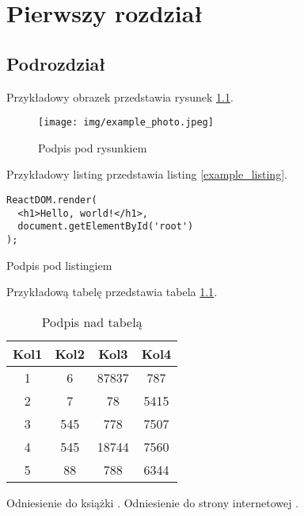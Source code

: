 \documentclass[a4paper,12pt,polish,twoside]{extreport}
\begin{document}


\null\newpage

\tableofcontents

\chapter{Pierwszy rozdział}

\section{Podrozdział}

Przykładowy obrazek przedstawia rysunek \ref{example_image}.

\begin{figure}[H]
    \centering
    \texttt{[image: img/example\_photo.jpeg]}
    \caption[Podpis w spisie rysunków]{Podpis pod rysunkiem}
    \label{example_image}
\end{figure}

Przykładowy listing przedstawia listing \ref{example_listing}.

\begin{code}[H]
\begin{lstlisting}
ReactDOM.render(
  <h1>Hello, world!</h1>,
  document.getElementById('root')
);
\end{lstlisting}
\caption[Podpis w spisie listingów]{Podpis pod listingiem}
\label{example_listing}
\end{code}

Przykładową tabelę przedstawia tabela \ref{example_table}.
 
\begin{table}[H]
\centering
\begin{tabular}{|c | c | c | c|} 
 \hline
 Kol1 & Kol2 & Kol3 & Kol4 \\
 \hline
 1 & 6 & 87837 & 787 \\
 2 & 7 & 78 & 5415 \\
 3 & 545 & 778 & 7507 \\
 4 & 545 & 18744 & 7560 \\
 5 & 88 & 788 & 6344 \\
 \hline
\end{tabular}
\caption[Podpis w spisie tabel]{Podpis nad tabelą}
\label{example_table}
\end{table}

Odniesienie do książki \cite{example_book}. Odniesienie do strony internetowej \cite{example_website}.
\end{document}
